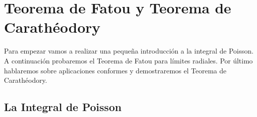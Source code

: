 \chapter{Teorema de Fatou y Teorema de Carathéodory}

\begin{comment}
    \begin{theorem}[Lema de Schwart]
        Sea $f: \disk \to \closedisk$ una función $\in \holomorphic{\disk}$ tal que $f(0) = 0$. Entonces:
        \begin{enumerate}[(i)]
            \item $\abs{f(z)} \leq \abs{z}$ para todo $z \in \disk$.
            \item Si para algún $z_0 \not = 0$ tenemos que $\abs{f(z_0)} = \abs{z_0}$, entonces existe $\alpha \in \complex, \abs{\alpha} = 1$ tal que $f(z)=\alpha z$.
        \end{enumerate}
    \end{theorem}

    \begin{proof}
        Sea $f(z) = a_1z + \cdots$ la serie de potencias de $f$. El término constante es $0$ puesto que suponemos que $f(0) = 0$. Entonces $f(z)/z$ es una función holomorfa y
        \begin{equation*}
            \abs{\dfrac{f(z)}{z}} < 1/r \text{ para } \abs{z} = r < 1
        \end{equation*}
    \end{proof}
\end{comment}

Para empezar vamos a realizar una pequeña introducción a la integral de Poisson. A continuación probaremos el Teorema de Fatou para límites radiales. Por último hablaremos sobre aplicaciones conformes y demostraremos el Teorema de Carathéodory. \\

\section{La Integral de Poisson}

